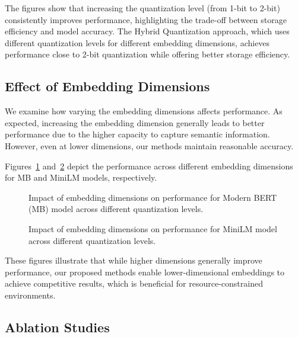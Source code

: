 The figures show that increasing the quantization level (from 1-bit to 2-bit) consistently improves performance, highlighting the trade-off between storage efficiency and model accuracy. The Hybrid Quantization approach, which uses different quantization levels for different embedding dimensions, achieves performance close to 2-bit quantization while offering better storage efficiency.

\subsection{Effect of Embedding Dimensions}

We examine how varying the embedding dimensions affects performance. As expected, increasing the embedding dimension generally leads to better performance due to the higher capacity to capture semantic information. However, even at lower dimensions, our methods maintain reasonable accuracy.

Figures~\ref{fig:dimension_impact_mb} and~\ref{fig:dimension_impact_minilm} depict the performance across different embedding dimensions for MB and MiniLM models, respectively.

\begin{figure}[ht]
    \centering
    \caption{Impact of embedding dimensions on performance for Modern BERT (MB) model across different quantization levels.}
    \label{fig:dimension_impact_mb}
\end{figure}

\begin{figure}[ht]
    \centering
    \caption{Impact of embedding dimensions on performance for MiniLM model across different quantization levels.}
    \label{fig:dimension_impact_minilm}
\end{figure}

These figures illustrate that while higher dimensions generally improve performance, our proposed methods enable lower-dimensional embeddings to achieve competitive results, which is beneficial for resource-constrained environments.

\subsection{Ablation Studies}

